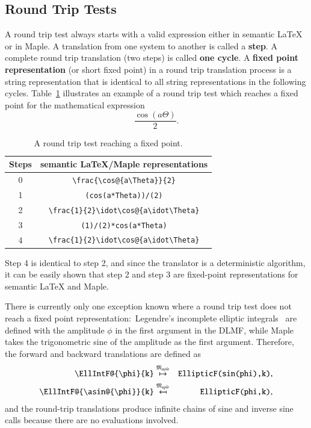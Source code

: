\documentclass[a4paper,11pt]{article}
\newcommand{\DLMF}{DLMF}
\newcommand{\Maple}{Maple}
\newcommand{\langMaple}{\mathfrak{M}_{aple}}
\theoremstyle{defTheoStyle}
\theoremstyle{defExampStyle}
\begin{document}
\subsection{Round Trip Tests}\label{sec:round-trip}
A round trip test always starts with a valid expression either in semantic \LaTeX{} or in \Maple. A translation from one system to another is called a \textbf{step}. A complete round trip translation (two steps) is called \textbf{one cycle}. A \textbf{fixed point representation} (or short fixed point) in a round trip translation process is a string representation that is identical to all string representations in the following cycles. Table~\ref{tab:fixpoint} illustrates an example of a round trip test which reaches a fixed point for the mathematical expression
\begin{equation}
\frac{\cos\left(a\Theta\right)}{2}.
\end{equation}

\begin{table}[ht]
\centering
\begin{tabular}{cc}
	\hline 
	Steps & semantic \LaTeX{}/\Maple{} representations\\
	\hline
	\rule{0pt}{0.9\normalbaselineskip}0 & \verb|\frac{\cos@{a\Theta}}{2}|\\
	1 & \verb|(cos(a*Theta))/(2)| \\
	2 & \verb|\frac{1}{2}\idot\cos@{a\idot\Theta}| \\
	3 & \verb|(1)/(2)*cos(a*Theta)|\\
	4 & \verb|\frac{1}{2}\idot\cos@{a\idot\Theta}| \\
	\hline
\end{tabular}
\caption{A round trip test reaching a fixed point.}
\label{tab:fixpoint}
\end{table}

Step 4 is identical to step 2, and since the translator is a deterministic algorithm, it can be easily shown that step 2 and step 3 are fixed-point representations for semantic \LaTeX{} and \Maple.

There is currently only one exception known where a round trip test does not reach a fixed point representation:~Legendre's incomplete elliptic integrals~\parencite[(19.2.4-7)]{NIST:DLMF} are defined with the amplitude $\phi$ in the first argument in the \DLMF, while \Maple{} takes the trigonometric sine of the amplitude as the first argument. Therefore, the forward and backward translations are defined as
\begin{eqnarray}
\verb|\EllIntF@{\phi}{k}| & \overset{\langMaple}{\mapsto} & \verb|EllipticF(sin(phi),k)|,\\
\verb|\EllIntF@{\asin@{\phi}}{k}| & \overset{\langMaple}{\mapsfrom} & \verb|EllipticF(phi,k)|,
\end{eqnarray}
and the round-trip translations produce infinite chains of sine and inverse sine calls because there are no evaluations involved. 
\end{document}
